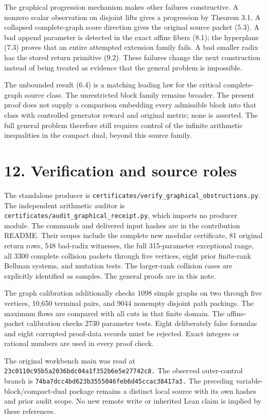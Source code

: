The graphical progression mechanism makes other failures constructive. A nonzero scalar observation on disjoint lifts gives a progression by Theorem 3.1. A collapsed complete-graph score direction gives the original source packet (5.3). A bad append parameter is detected in the exact affine fibers (8.1); the hyperplane (7.3) proves that an entire attempted extension family fails. A bad smaller radix has the stored return primitive (9.2). These failures change the next construction instead of being treated as evidence that the general problem is impossible.

The unbounded result (6.4) is a matching leading law for the critical complete-graph source class. The unrestricted block family remains broader. The present proof does not supply a comparison embedding every admissible block into that class with controlled generator reward and original metric; none is asserted. The full general problem therefore still requires control of the infinite arithmetic inequalities in the compact dual, beyond this source family.

\section{12. Verification and source roles}\label{n08-verification-and-source-roles}

The standalone producer is \nolinkurl{certificates/verify_graphical_obstructions.py}. The independent arithmetic auditor is \nolinkurl{certificates/audit_graphical_receipt.py}, which imports no producer module. The commands and delivered input hashes are in the contribution README. Their scopes include the complete new modular certificate, 81 original return rows, 548 bad-radix witnesses, the full 315-parameter exceptional range, all 3300 complete collision packets through five vertices, eight prior finite-rank Bellman systems, and mutation tests. The larger-rank collision cases are explicitly identified as samples. The general proofs are in this note.

The graph calibration additionally checks 1098 simple graphs on two through five vertices, 10,650 terminal pairs, and 9044 nonempty disjoint path packings. The maximum flows are compared with all cuts in that finite domain. The affine-packet calibration checks 2730 parameter tests. Eight deliberately false formulas and eight corrupted proof-data records must be rejected. Exact integers or rational numbers are used in every proof check.

The original workbench main was read at \nolinkurl{23c0110c95b5a2036bdc04a1f352b6e5e27742c8.} The observed outer-control branch is \nolinkurl{74ba7dcc4bd623b3555046feb6d45ccac38417a3.} The preceding variable-block/compact-dual package remains a distinct local source with its own hashes and prior audit scope. No new remote write or inherited Lean claim is implied by these references.

